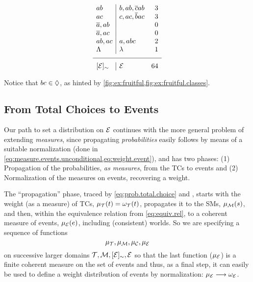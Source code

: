 \documentclass[x11names]{tlp}
\begin{document}
\begin{example}
\begin{equation*}
\begin{array}{l|lr}
				ab     & b, ab, \co{c}ab                                                                    & 3 \\%
				ac     & c, ac, \co{b}ac                                                                    & 3 \\%
				\co{a}, ab
				       &
				       & 0                                                                                      %
				\\
				\co{a}, ac
				       &
				       & 0
				\\
				ab, ac & a, abc                                                                             & 2 \\%
				\consequenceclass
				       & \emptyevent
				       & 1
				\\
				\hline \class{\EVENTSset}
				       & \EVENTSset
				       & 64
			\end{array}
		\end{equation*}

		Notice that $bc \in \Diamond$, as hinted by
		\cref{fig:ex:fruitful,fig:ex:fruitful.classes}.
	\end{example}
\fi

\subsection{From Total Choices to Events}
\label{subsec:from.tchoices.to.events}

Our path to set a distribution on $\EVENTSset$ continues with the more general problem of extending \emph{measures}, since propagating \emph{probabilities} easily follows by means of a suitable normalization
(done in \cref{eq:measure.events.unconditional,eq:weight.event}), and has two phases: (1) Propagation of the probabilities, \emph{as measures}, from the \aclp{TC} to events and (2) Normalization of the measures on events, recovering a weight.

The ``propagation'' phase, traced by \cref{eq:prob.total.choice} and , starts with the weight (as a measure) of \aclp{TC}, $\pwt{t} = \wgtT\at{t}$, propagates it to the \aclp{SM}, $\pwm{s}$, and then, within the equivalence relation from \cref{eq:equiv.rel}, to a coherent measure of events,
$\pwe{e}$, including (consistent) worlds.
So we are specifying a sequence of functions
\begin{equation}
	\pwT , \pwM , \pwC , \pwE\label{eq:sequence.functions}
\end{equation}
on successive larger domains
\(
\TCHOICEset , \MODELset , \class{\EVENTSset} , \EVENTSset
\)
so that the last function ($\pwE$) is a finite coherent measure on the set of events and thus, as a final step, it can easily be used to define a weight distribution of events by normalization:
\(
\pwE \longrightarrow \wgtE
\).
\end{document}
